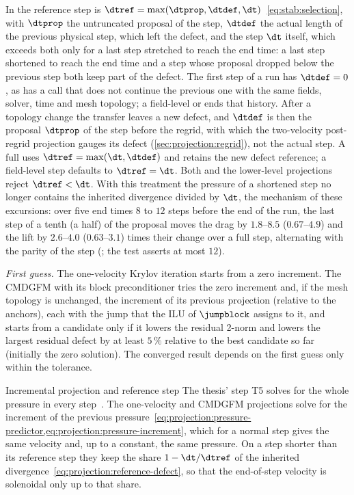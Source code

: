 In  the reference step is
$\dtref=\max(\dtprop,\dtdef,\dt)$~\cref{eq:stab:selection}, with $\dtprop$
the untruncated proposal of the step, $\dtdef$ the actual length of the
previous physical step, which left the defect, and the step $\dt$ itself,
which exceeds both only for a last step stretched to reach the end time: a
last step shortened to reach the end time and a step whose proposal dropped
below the previous step both keep part of the defect. The first step of a run has
$\dtdef=0$, as has a call that does not continue the previous one with the
same fields, solver, time and mesh topology; a field-level  or
 ends that history. After a topology change the
transfer leaves a new defect, and $\dtdef$ is then the proposal $\dtprop$ of
the step before the regrid, with which the two-velocity post-regrid
projection gauges its defect (\cref{sec:projection:regrid}), not the actual
step. A full  uses
$\dtref=\max(\dt,\dtdef)$ and retains the new defect reference; a field-level
step defaults to $\dtref=\dt$. Both  and the lower-level
projections reject $\dtref<\dt$. With this treatment the pressure
of a shortened step no longer contains the inherited divergence divided by
$\dt$, the mechanism of these excursions: over five end times $8$ to $12$
steps before the end of the run, the last step of a tenth (a half) of the
proposal moves the drag by $1.8$--$8.5$ ($0.67$--$4.9$) and the lift by
$2.6$--$4.0$ ($0.63$--$3.1$) times their change over a full step, alternating
with the parity of the step (; the test asserts at most $12$).

\emph{First guess.} The one-velocity Krylov iteration starts from a zero
increment. The CMDGFM with its block preconditioner tries the zero increment
and, if the mesh topology is unchanged, the increment of its previous
projection (relative to the anchors), each with the jump that the ILU of
$\jumpblock$ assigns to it, and starts from a candidate only if it lowers the
residual 2-norm and lowers the largest residual defect by at least $5\,\%$
relative to the best candidate so far (initially the zero solution). The
converged result depends on the first guess only within the tolerance.

\begin{deviation}{Incremental projection and reference step}\label{dev:projection:incremental}
The thesis' step T5 solves for the whole pressure in every
step~. The one-velocity and CMDGFM projections solve for the
increment of the previous
pressure~\cref{eq:projection:pressure-predictor,eq:projection:pressure-increment},
which for a normal step gives the same velocity and, up to a constant, the
same pressure. On a step shorter than its reference step they keep the share
$1-\dt/\dtref$ of the inherited divergence~\cref{eq:projection:reference-defect},
so that the end-of-step velocity is solenoidal only up to that share.
\end{deviation}


